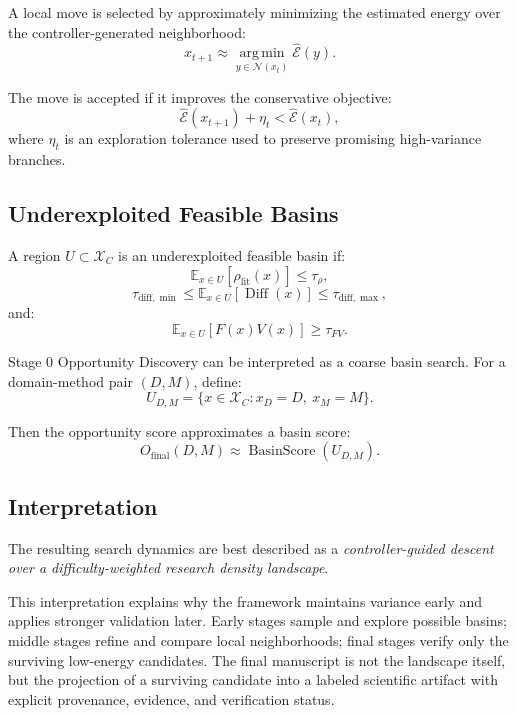 \documentclass[11pt]{article}
\begin{document}
A local move is selected by approximately minimizing the estimated energy over the controller-generated neighborhood:
$$ x_{t+1} \approx \operatorname*{arg\,min}_{y\in\mathcal{N}(x_t)} \widehat{\mathcal{E}}(y). $$

The move is accepted if it improves the conservative objective:
$$ \widehat{\mathcal{E}}(x_{t+1})+\eta_t < \widehat{\mathcal{E}}(x_t), $$
where $\eta_t$ is an exploration tolerance used to preserve promising high-variance branches.

\subsection{Underexploited Feasible Basins}
A region $U\subset\mathcal{X}_C$ is an underexploited feasible basin if:
$$ \mathbb{E}_{x\in U}[\rho_{\mathrm{lit}}(x)]\leq \tau_\rho, $$
$$ \tau_{\mathrm{diff}, \min} \leq \mathbb{E}_{x\in U}[\operatorname{Diff}(x)] \leq \tau_{\mathrm{diff},\max}, $$
and:
$$ \mathbb{E}_{x\in U}[F(x)V(x)]\geq \tau_{FV}. $$

Stage 0 Opportunity Discovery can be interpreted as a coarse basin search. For a domain-method pair $(D,M)$, define:
$$ U_{D,M} = \{x\in\mathcal{X}_C:x_D=D,\ x_M=M\}. $$

Then the opportunity score approximates a basin score:
$$ O_{\mathrm{final}}(D,M) \approx \operatorname{BasinScore}(U_{D,M}). $$

\subsection{Interpretation}
The resulting search dynamics are best described as a \textit{controller-guided descent over a difficulty-weighted research density landscape}.

This interpretation explains why the framework maintains variance early and applies stronger validation later. Early stages sample and explore possible basins; middle stages refine and compare local neighborhoods; final stages verify only the surviving low-energy candidates. The final manuscript is not the landscape itself, but the projection of a surviving candidate into a labeled scientific artifact with explicit provenance, evidence, and verification status.
\end{document}
